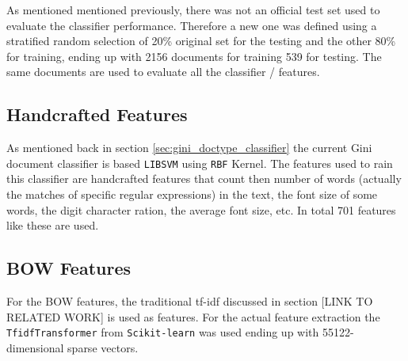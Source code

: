As mentioned mentioned previously, there was not an official test set used to
evaluate the classifier performance. Therefore a new one was defined using a
stratified random selection of 20\% original  set for the testing and the
other 80\% for training, ending up with 2156 documents for training  539 for
testing. The same documents are used to evaluate all the classifier /
features.


\subsection{Handcrafted Features}
\label{sec:sub_w2v4tc_current_features}

As mentioned back in section  \ref{sec:gini_doctype_classifier} the current
Gini document classifier is based  \texttt{LIBSVM} \cite{CC01a} using 
\texttt{RBF} Kernel.   The features used to rain this classifier are
handcrafted features that count then number of words (actually the matches of
specific regular expressions) in the text, the font size of some
words, the digit character ration, the average font size, etc. In total 701 features like these are used.
 

\subsection{\ac{BOW} Features}
\label{sec:sub_w2v4tc_bow_features}

For the \ac{BOW} features, the traditional \ac{tf-idf}  
\cite{Salton88term-weightingapproaches}\cite{Sebastiani02} discussed in
section [LINK TO RELATED WORK] is used as features. For the actual feature
extraction the \texttt{TfidfTransformer} from \texttt{Scikit-learn}
\cite{scikit-learn}  was used ending up with 55122-dimensional sparse
vectors.
  









